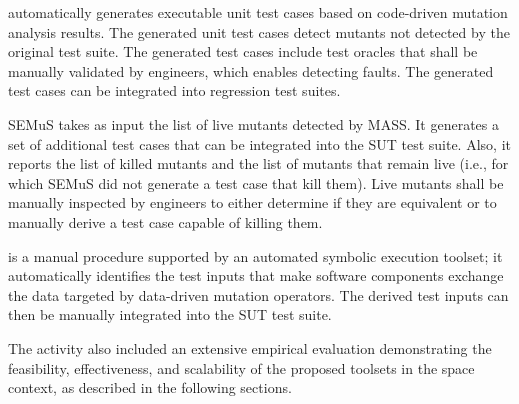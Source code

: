  automatically generates executable unit test cases based on code-driven mutation analysis results. The generated unit test cases detect mutants not detected by the original test suite. The generated test cases include test oracles that shall be manually validated by engineers, which enables detecting faults. The generated test cases can be integrated into regression test suites.

SEMuS takes as input the list of live mutants detected by MASS. It generates a set of additional test cases that can be integrated into the SUT test suite. Also, it reports the list of killed mutants and the list of mutants that remain live (i.e., for which SEMuS did not generate a test case that kill them). Live mutants shall be manually inspected by engineers to either determine if they are equivalent or to manually derive a test case capable of killing them.

 is a manual procedure supported by an automated symbolic execution toolset; it automatically identifies the test inputs that make software components exchange the data targeted by data-driven mutation operators. The derived test inputs can then be manually integrated into the SUT test suite.

The activity also included an extensive empirical evaluation demonstrating the feasibility, effectiveness, and scalability of the proposed toolsets in the space context, as described in the following sections.


